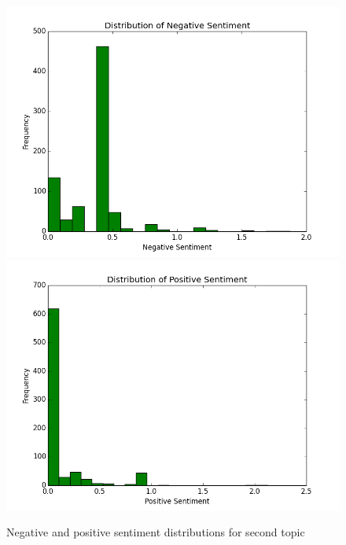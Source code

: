 \documentclass{article}
\begin{document}
\begin{enumerate}
\begin{figure}[H]
			\includegraphics[scale=0.35]{1neg.png}
			\includegraphics[scale=0.35]{1pos.png}
			\begin{center}
			\caption{Negative and positive sentiment distributions for second topic}
			\end{center}
		\end{figure}
		

\end{enumerate}
\end{document}

